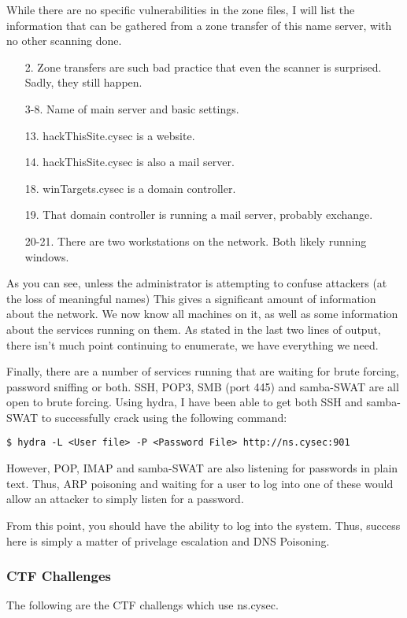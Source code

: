 				While there are no specific vulnerabilities in the zone files, I will list the information that can be gathered from a zone transfer of this name server, with no other scanning done. 
				
				\begin{enumerate}
					\item[2.] Zone transfers are such bad practice that even the scanner is surprised. Sadly, they still happen. 
					\item[3-8.] Name of main server and basic settings.
					\item[13.] hackThisSite.cysec is a website. 
					\item[14.] hackThisSite.cysec is also a mail server. 
					\item[18.] winTargets.cysec is a domain controller. 
					\item[19.] That domain controller is running a mail server, probably exchange. 
					\item[20-21.] There are two workstations on the network. Both likely running windows. 
				\end{enumerate}
				As you can see, unless the administrator is attempting to confuse attackers (at the loss of meaningful names)
				This gives a significant amount of information about the network. 
				We now know all machines on it, as well as some information about the services running on them. 
				As stated in the last two lines of output, there isn't much point continuing to enumerate, we have everything we need. 

				Finally, there are a number of services running that are waiting for brute forcing, password sniffing or both. 
				SSH, POP3, SMB (port 445) and samba-SWAT are all open to brute forcing. 
				Using hydra, I have been able to get both SSH and samba-SWAT to successfully crack using the following command:
				\begin{lstlisting}[style=CLI]
					$ hydra -L <User file> -P <Password File> http://ns.cysec:901
				\end{lstlisting}
					
				However, POP, IMAP and samba-SWAT are also listening for passwords in plain text. 
				Thus, ARP poisoning and waiting for a user to log into one of these would allow an attacker to simply listen for a password. 

				From this point, you should have the ability to log into the system. 
				Thus, success here is simply a matter of privelage escalation and DNS Poisoning. 
			\subsubsection{CTF Challenges}
				The following are the CTF challengs which use ns.cysec.
